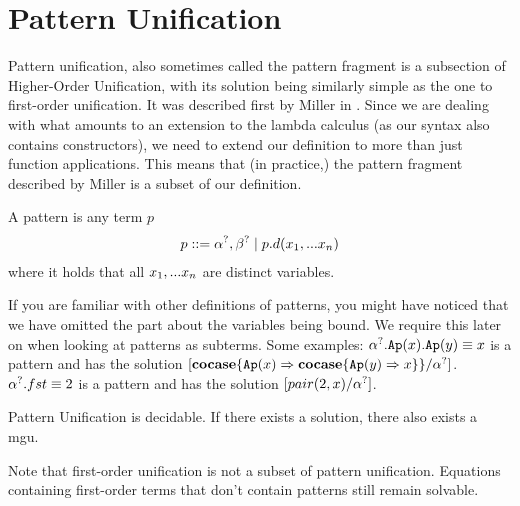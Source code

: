 \documentclass[twoside,12pt,a4paper]{article}
\begin{document}
\section{Pattern Unification}

Pattern unification, also sometimes called the pattern fragment
is a subsection of Higher-Order Unification,
with its solution being similarly simple as the one to first-order unification.
It was described first by Miller in \cite{10.1093/logcom/1.4.497}.
Since we are dealing with what amounts to an extension to the lambda calculus (as our syntax also contains constructors), we need to extend our definition to more than just function applications. 
This means that (in practice,) the pattern fragment described by Miller is a subset of our definition.

\begin{definition}[Pattern]
    A pattern is any term $p$ 
    \begin{align*}
        p ::= \alpha^?, \beta^? \;|\; p.d(x_1,...x_n)
    \end{align*}
    where it holds that all $x_1,...x_n$ are distinct variables.
\end{definition}

If you are familiar with other definitions of patterns, you might have noticed that 
we have omitted the part about the variables being bound. We require this later on when looking at patterns as subterms.
Some examples:
$\alpha^?.\texttt{Ap}(x).\texttt{Ap}(y)\equiv x$ is a pattern and has the solution $[\textbf{cocase}\{\texttt{Ap}(x)\Rightarrow\textbf{cocase}\{\texttt{Ap}(y)\Rightarrow x\}\}/\alpha^?]$.
$\alpha^?.fst \equiv 2$ is a pattern and has the solution $[pair(2,x)/\alpha^?]$.


\begin{theorem}
    Pattern Unification is decidable. If there exists a solution, there also exists a mgu.
\end{theorem}

Note that first-order unification is not a subset of pattern unification. 
Equations containing first-order terms that don't contain patterns still remain solvable.
\end{document}
